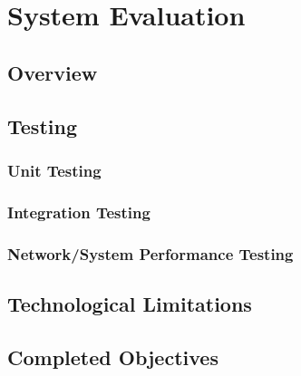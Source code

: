 \chapter{System Evaluation}
\section{Overview}
\section{Testing}
\subsection{Unit Testing}
\subsection{Integration Testing}
\subsection{Network/System Performance Testing}

\section{Technological Limitations}

\section{Completed Objectives}